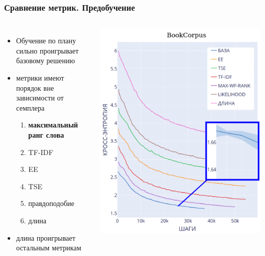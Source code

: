 \documentclass{beamer}
\begin{document}
\begin{frame}
	\frametitle{Сравнение метрик. Предобучение}
	\begin{columns}
			\begin{itemize}
				\item Обучение по плану сильно проигрывает базовому решению
				\item метрики имеют порядок вне зависимости от семплера
				\begin{enumerate}
					\item {\bf максимальный ранг слова}
					\item TF-IDF
					\item EE
					\item TSE
					\item правдоподобие
					\item длина
				\end{enumerate}
				\item длина проигрывает остальным метрикам
			\end{itemize}
			\includegraphics[scale=0.28]{BookCorpus_results}
	\end{columns}
\end{frame}
\end{document}
